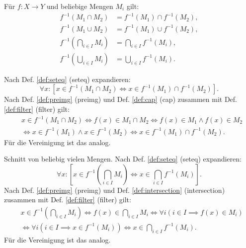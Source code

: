 \begin{Satz}%
\label{preimg-dl}\newlinefirst
Für $f\colon X\to Y$ und beliebige Mengen $M_i$ gilt:
\begin{align}
f^{-1}(M_1\cap M_2) &= f^{-1}(M_1)\cap f^{-1}(M_2),\\
f^{-1}(M_1\cup M_2) &= f^{-1}(M_1)\cup f^{-1}(M_2),\\
f^{-1}(\bigcap_{i\in I} M_i) &= \bigcap_{i\in I} f^{-1}(M_i),\\
f^{-1}(\bigcup_{i\in I} M_i) &= \bigcup_{i\in I} f^{-1}(M_i).
\end{align}
\end{Satz}

\begin{Beweis}
Nach Def. \ref{def:seteq} (seteq) expandieren:
\[\forall x\colon [x\in f^{-1}(M_1\cap M_2)\iff x\in f^{-1}(M_1)\cap f^{-1}(M_2)].\]
Nach Def. \ref{def:preimg} (preimg) und Def. \ref{def:cap} (cap)
zusammen mit Def. \ref{def:filter} (filter) gilt:
\begin{align*}
& x\in f^{-1}(M_1\cap M_2) \iff f(x)\in M_1\cap M_2
\iff f(x)\in M_1\land f(x)\in M_2\\
&\iff x\in f^{-1}(M_1)\land x\in f^{-1}(M_2)
\iff x\in f^{-1}(M_1)\cap f^{-1}(M_2).
\end{align*}
Für die Vereinigung ist das analog.

Schnitt von beliebig vielen Mengen.
Nach Def. \ref{def:seteq} (seteq) expandieren:
\[\forall x\colon [x\in f^{-1}(\bigcap_{i\in I}M_i)
\iff x\in \bigcap_{i\in I} f^{-1}(M_i)].\]
Nach Def. \ref{def:preimg} (preimg) und Def. \ref{def:intersection}
(intersection) zusammen mit Def. \ref{def:filter} (filter) gilt:
\begin{align*}
& x\in f^{-1}(\bigcap_{i\in I} M_i)\iff f(x)\in\bigcap_{i\in I} M_i
\iff \forall i(i\in I\implies f(x)\in M_i)\\
&\iff \forall i(i\in I\implies x\in f^{-1}(M_i))
\iff x\in \bigcap_{i\in I} f^{-1}(M_i).
\end{align*}
Für die Vereinigung ist das analog.\;\qedsymbol
\end{Beweis}

